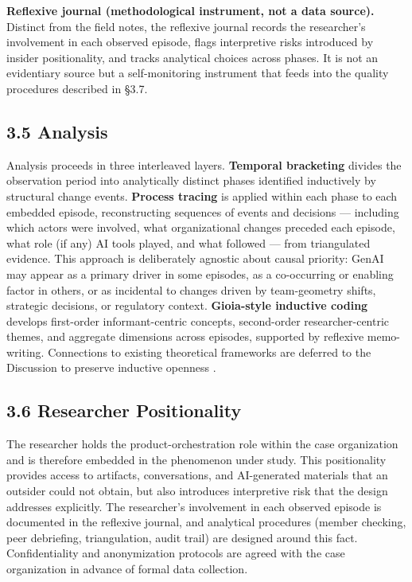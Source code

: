 \documentclass[11pt,a4paper]{article}
\begin{document}
\textbf{Reflexive journal (methodological instrument, not a data source).}
Distinct from the field notes, the reflexive journal records the
researcher's involvement in each observed episode, flags interpretive
risks introduced by insider positionality, and tracks analytical choices
across phases. It is not an evidentiary source but a self-monitoring
instrument that feeds into the quality procedures described in §3.7.

\subsection*{3.5 Analysis}

Analysis proceeds in three interleaved layers. \textbf{Temporal bracketing} \citep{langley1999strategies} divides the observation period into analytically distinct phases identified inductively by structural change events. \textbf{Process tracing} \citep{langley2017handbook} is applied within each phase to each embedded episode, reconstructing sequences of events and decisions --- including which actors were involved, what organizational changes preceded each episode, what role (if any) AI tools played, and what followed --- from triangulated evidence. This approach is deliberately agnostic about causal priority: GenAI may appear as a primary driver in some episodes, as a co-occurring or enabling factor in others, or as incidental to changes driven by team-geometry shifts, strategic decisions, or regulatory context. \textbf{Gioia-style inductive coding} \citep{gioia2013seeking} develops first-order informant-centric concepts, second-order researcher-centric themes, and aggregate dimensions across episodes, supported by reflexive memo-writing. Connections to existing theoretical frameworks are deferred to the Discussion to preserve inductive openness \citep{braun2006thematic}.

\subsection*{3.6 Researcher Positionality}

The researcher holds the product-orchestration role within the case organization and is therefore embedded in the phenomenon under study. This positionality provides access to artifacts, conversations, and AI-generated materials that an outsider could not obtain, but also introduces interpretive risk that the design addresses explicitly. The researcher's involvement in each observed episode is documented in the reflexive journal, and analytical procedures (member checking, peer debriefing, triangulation, audit trail) are designed around this fact. Confidentiality and anonymization protocols are agreed with the case organization in advance of formal data collection.
\end{document}
